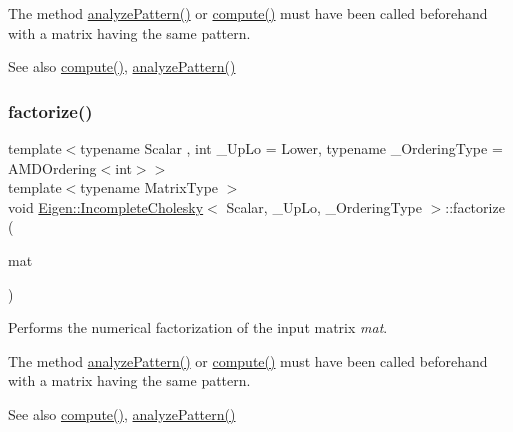 The method \hyperlink{class_eigen_1_1_incomplete_cholesky_a702560ecdddef77dc51d20ab22bd974e}{analyze\+Pattern()} or \hyperlink{class_eigen_1_1_incomplete_cholesky_a7966bedeebbeaa7a8fe4dd1da3797a0b}{compute()} must have been called beforehand with a matrix having the same pattern.

\begin{DoxySeeAlso}{See also}
\hyperlink{class_eigen_1_1_incomplete_cholesky_a7966bedeebbeaa7a8fe4dd1da3797a0b}{compute()}, \hyperlink{class_eigen_1_1_incomplete_cholesky_a702560ecdddef77dc51d20ab22bd974e}{analyze\+Pattern()} 
\end{DoxySeeAlso}
\mbox{\label{class_eigen_1_1_incomplete_cholesky_ac39c75ff7ca5d2db9a9f03b937e12601}} 
\subsubsection{\texorpdfstring{factorize()}{factorize()}\hspace{0.1cm}{\footnotesize\ttfamily [2/2]}}
{\footnotesize\ttfamily template$<$typename Scalar , int \+\_\+\+Up\+Lo = Lower, typename \+\_\+\+Ordering\+Type  = A\+M\+D\+Ordering$<$int$>$$>$ \\
template$<$typename Matrix\+Type $>$ \\
void \hyperlink{class_eigen_1_1_incomplete_cholesky}{Eigen\+::\+Incomplete\+Cholesky}$<$ Scalar, \+\_\+\+Up\+Lo, \+\_\+\+Ordering\+Type $>$\+::factorize (\begin{DoxyParamCaption}\item[{const Matrix\+Type \&}]{mat }\end{DoxyParamCaption})}



Performs the numerical factorization of the input matrix {\itshape mat}. 

The method \hyperlink{class_eigen_1_1_incomplete_cholesky_a702560ecdddef77dc51d20ab22bd974e}{analyze\+Pattern()} or \hyperlink{class_eigen_1_1_incomplete_cholesky_a7966bedeebbeaa7a8fe4dd1da3797a0b}{compute()} must have been called beforehand with a matrix having the same pattern.

\begin{DoxySeeAlso}{See also}
\hyperlink{class_eigen_1_1_incomplete_cholesky_a7966bedeebbeaa7a8fe4dd1da3797a0b}{compute()}, \hyperlink{class_eigen_1_1_incomplete_cholesky_a702560ecdddef77dc51d20ab22bd974e}{analyze\+Pattern()} 
\end{DoxySeeAlso}
\mbox{\label{class_eigen_1_1_incomplete_cholesky_ada0e68cb22601849464506f5986a88c1}} 
